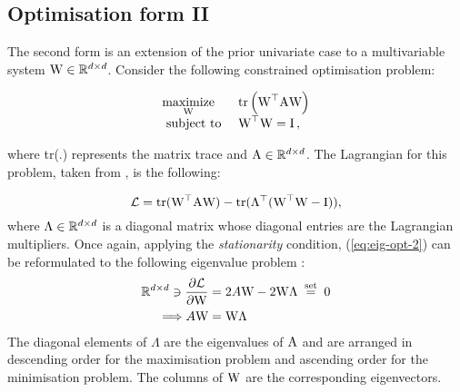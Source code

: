 \subsection{Optimisation form II}
\label{subsection:eig-opt-form-2}
The second form is an extension of the prior univariate case to a multivariable system ${\textrm{W}} \in \mathbb{R}^{d\times d}$. Consider the following constrained optimisation problem:

\begin{equation}
\begin{array}{ll}
\underset{\boldsymbol{{\textrm{W}}}}{\operatorname{maximize}} & \operatorname{tr}\left({\textrm{W}}^{\top} {\textrm{A}} \boldsymbol{{\textrm{W}}}\right) \\
\text { subject to } & \boldsymbol{{\textrm{W}}}^{\top} \boldsymbol{{\textrm{W}}}=\boldsymbol{{\textrm{I}}}\, ,
\end{array}
\label{eq:eig-opt-2}
\end{equation}

where tr(.) represents the matrix trace and ${\textrm{A}} \in \mathbb{R}^{d\times d}$. The Lagrangian for this problem, taken from
\cite{eig-tutorial}, is the following:

\begin{equation}
    \mathcal{L} = \text{tr}({\textrm{W}}^\top {\textrm{A}} {\textrm{W}}) - \text{tr}(\Lambda^\top({\textrm{W}}^\top{\textrm{W}} - {\textrm{I}})),
\end{equation}
where $\Lambda \in \mathbb{R}^{d\times d}$ is a diagonal matrix whose diagonal entries are the Lagrangian multipliers. Once again, applying the \textit{stationarity} condition, (\ref{eq:eig-opt-2}) can be reformulated to the following eigenvalue problem \cite{eig-tutorial}:
\begin{align}
\mathbb{R}^{d \times d} \ni \frac{\partial \mathcal{L}}{\partial {\textrm{W}}}&=2 A {\textrm{W}} -2 {\textrm{W}} \Lambda \stackrel{\text { set }}{=} 0 \\
\Longrightarrow A {\textrm{W}} &={\textrm{W}} \Lambda
\end{align}
The diagonal elements of $\Lambda$ are the eigenvalues of ${\textrm{A}}$ and are arranged in descending order for the maximisation problem and ascending order for the minimisation problem. The columns of ${\textrm{W}}$ are the corresponding eigenvectors.

